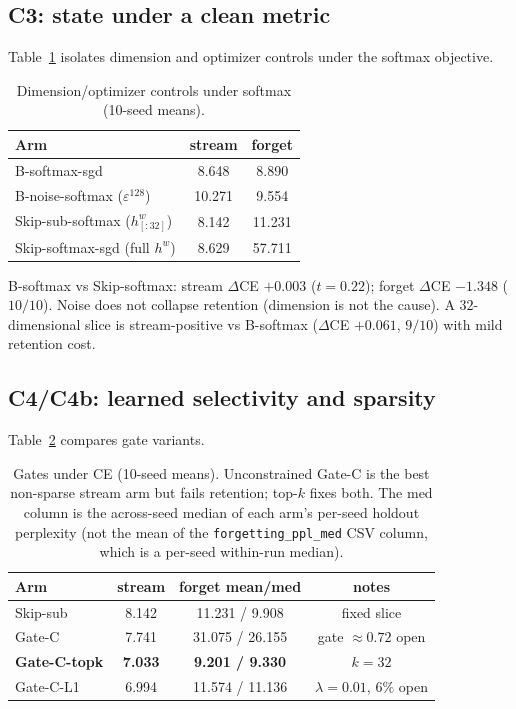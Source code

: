 \documentclass[preprint,12pt]{elsarticle}
\begin{document}
\subsection{C3: state under a clean metric}
Table~\ref{tab:c3} isolates dimension and optimizer controls under the
softmax objective.
\begin{table}[h]
\centering
\caption{Dimension/optimizer controls under softmax (10-seed means).}
\label{tab:c3}
\begin{tabular}{lcc}
\toprule
Arm & stream & forget \\
\midrule
B-softmax-sgd & 8.648 & 8.890 \\
B-noise-softmax ($\varepsilon^{128}$) & 10.271 & 9.554 \\
Skip-sub-softmax ($h^w_{[:32]}$) & 8.142 & 11.231 \\
Skip-softmax-sgd (full $h^w$) & 8.629 & 57.711 \\
\bottomrule
\end{tabular}
\end{table}

B-softmax vs Skip-softmax: stream $\Delta$CE $+0.003$ ($t=0.22$);
forget $\Delta$CE $-1.348$ ($10/10$). Noise does not collapse
retention (dimension is not the cause). A $32$-dimensional slice is
stream-positive vs B-softmax ($\Delta$CE $+0.061$, $9/10$) with mild
retention cost.

\subsection{C4/C4b: learned selectivity and sparsity}
Table~\ref{tab:c4} compares gate variants.
\begin{table}[h]
\centering
\caption{Gates under CE (10-seed means). Unconstrained Gate-C is the
best non-sparse stream arm but fails retention; top-$k$ fixes both.
The med column is the across-seed median of each arm's per-seed
holdout perplexity (not the mean of the \texttt{forgetting\_ppl\_med}
CSV column, which is a per-seed within-run median).}
\label{tab:c4}
\begin{tabular}{lccc}
\toprule
Arm & stream & forget mean/med & notes \\
\midrule
Skip-sub & 8.142 & 11.231 / 9.908 & fixed slice \\
Gate-C & 7.741 & 31.075 / 26.155 & gate $\approx0.72$ open \\
\textbf{Gate-C-topk} & \textbf{7.033} & \textbf{9.201 / 9.330} & $k=32$ \\
Gate-C-L1 & 6.994 & 11.574 / 11.136 & $\lambda{=}0.01$, $6\%$ open \\
\bottomrule
\end{tabular}
\end{table}
\end{document}
